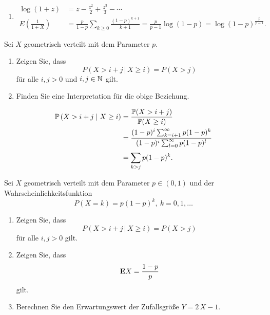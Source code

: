 \solution
\begin{enumerate}
    \item \begin{align*}
            \log (1+z) &= z - \frac{z^2}{2} + \frac{z^3}{3} - \cdots \\
            E \left( \frac{1}{1+X} \right) &= \frac{p}{1-p} \sum_{k\geq 0} \frac{(1-p)^{k+1}}{k+1}
            = \frac{p}{p-1} \log \left( 1-p \right) = \log (1-p)^{\frac{p}{p-1}}. 
        \end{align*}

\end{enumerate}

 Sei $X$ geometrisch
verteilt mit dem Parameter $p$.
\begin{enumerate}
    \item Zeigen Sie, dass 
        \begin{equation*}
            P \left( X > i+j \,|\, X \geq i \right) = P\left( X > j \right) 
        \end{equation*}
        für alle $i,j>0$ und $i,j\in\mathbb N$ gilt.

    \item Finden Sie eine Interpretation für die obige Beziehung.
\end{enumerate}

\solution 
\begin{align*}
    \mathbb P\left( X > i+j \;\middle\vert\; X \geq i \right) &= \frac{\mathbb P(X > i+j)}{\mathbb P(X \geq i)} \\
    &= \frac{  (1-p)^{i} \sum_{k=i+1}^{\infty} p(1-p)^{k} }{ (1-p)^{i} \sum_{l=0}^{\infty} p(1-p)^{l} } \\
    &= \sum_{k > j}^{} p(1-p)^k.
\end{align*}


 Sei 
$X$ geometrisch verteilt mit dem Parameter $p\in (0,1)$ und der 
Wahrscheinlichkeitsfunktion
\begin{equation*}
    P(X = k) = p(1-p)^{k}, \ k=0,1,\dots
\end{equation*}
\begin{enumerate}
    \item Zeigen Sie, dass
        \begin{equation*}
            P( X > i+j \,|\, X \geq i) = P(X > j)
        \end{equation*}
        für alle $i,j>0$ gilt.
    \item Zeigen Sie, dass 
        \begin{align*}
            \mathbf E X = \frac{1-p}{p}
        \end{align*}
        gilt.
    \item Berechnen Sie den Erwartungswert der Zufallsgröße $Y=2\,X -1$.
\end{enumerate}


